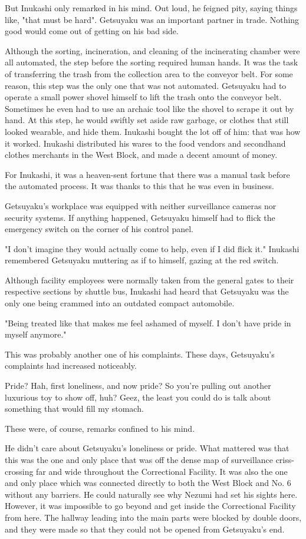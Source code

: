 But Inukashi only remarked in his mind. Out loud, he feigned pity,
saying things like, "that must be hard". Getsuyaku was an important
partner in trade. Nothing good would come out of getting on his bad
side.

Although the sorting, incineration, and cleaning of the incinerating
chamber were all automated, the step before the sorting required human
hands. It was the task of transferring the trash from the collection
area to the conveyor belt. For some reason, this step was the only one
that was not automated. Getsuyaku had to operate a small power shovel
himself to lift the trash onto the conveyor belt. Sometimes he even had
to use an archaic tool like the shovel to scrape it out by hand. At this
step, he would swiftly set aside raw garbage, or clothes that still
looked wearable, and hide them. Inukashi bought the lot off of him: that
was how it worked. Inukashi distributed his wares to the food vendors
and secondhand clothes merchants in the West Block, and made a decent
amount of money.

For Inukashi, it was a heaven-sent fortune that there was a manual task
before the automated process. It was thanks to this that he was even in
business.

Getsuyaku's workplace was equipped with neither surveillance cameras nor
security systems. If anything happened, Getsuyaku himself had to flick
the emergency switch on the corner of his control panel.

"I don't imagine they would actually come to help, even if I did flick
it." Inukashi remembered Getsuyaku muttering as if to himself, gazing at
the red switch.

Although facility employees were normally taken from the general gates
to their respective sections by shuttle bus, Inukashi had heard that
Getsuyaku was the only one being crammed into an outdated compact
automobile.

"Being treated like that makes me feel ashamed of myself. I don't have
pride in myself anymore."

This was probably another one of his complaints. These days, Getsuyaku's
complaints had increased noticeably.

Pride? Hah, first loneliness, and now pride? So you're pulling out
another luxurious toy to show off, huh? Geez, the least you could do is
talk about something that would fill my stomach.

These were, of course, remarks confined to his mind.

He didn't care about Getsuyaku's loneliness or pride. What mattered was
that this was the one and only place that was off the dense map of
surveillance criss-crossing far and wide throughout the Correctional
Facility. It was also the one and only place which was connected
directly to both the West Block and No. 6 without any barriers. He could
naturally see why Nezumi had set his sights here. However, it was
impossible to go beyond and get inside the Correctional Facility from
here. The hallway leading into the main parts were blocked by double
doors, and they were made so that they could not be opened from
Getsuyaku's end.


